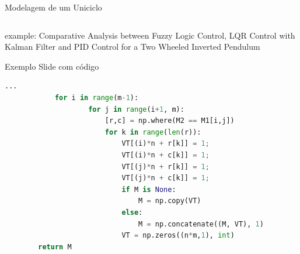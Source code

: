 \documentclass{beamer}
\begin{document}
\begin{frame}[c]{Modelagem de um Uniciclo}
\begin{columns}
\begin{column}[c]{0.6\textwidth}
        \end{column}
    \end{columns}   
    example: Comparative Analysis between Fuzzy Logic
    Control, LQR Control with Kalman Filter and PID
    Control for a Two Wheeled Inverted Pendulum
\end{frame}
 

\begin{frame}[fragile]{Exemplo Slide com código}

	\begin{lstlisting}[language=Python]
			... 
			for i in range(m-1):
					for j in range(i+1, m):
						[r,c] = np.where(M2 == M1[i,j])
						for k in range(len(r)):
							VT[(i)*n + r[k]] = 1;
							VT[(i)*n + c[k]] = 1;
							VT[(j)*n + r[k]] = 1;
							VT[(j)*n + c[k]] = 1;
							if M is None:
								M = np.copy(VT)
							else:
								M = np.concatenate((M, VT), 1)
							VT = np.zeros((n*m,1), int)
		return M
	\end{lstlisting}
\end{frame}
\end{document}
